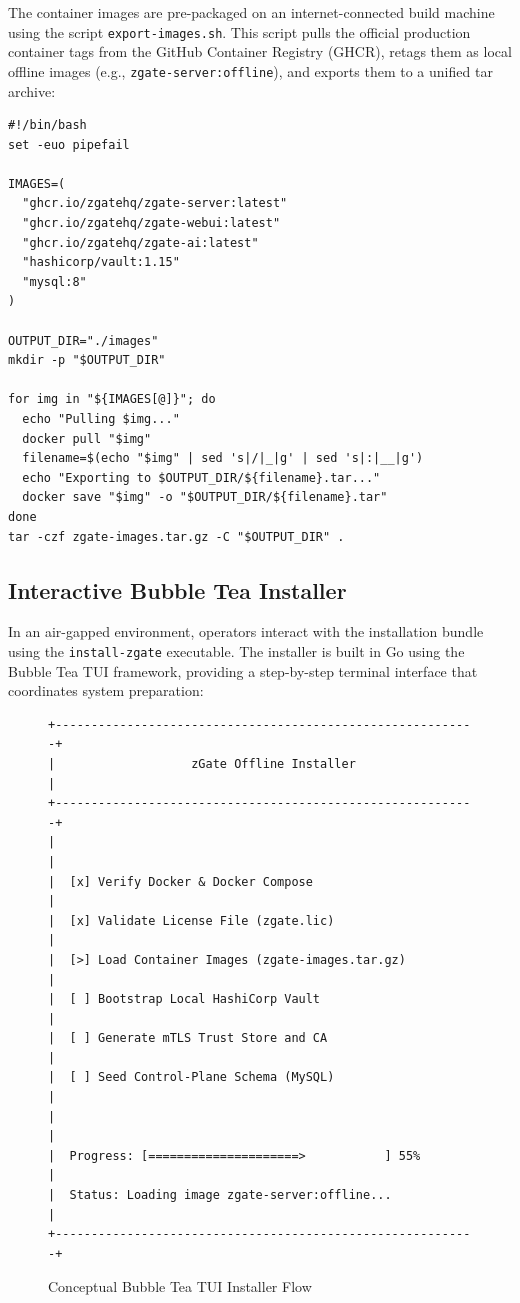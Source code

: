 The container images are pre-packaged on an internet-connected build machine using the script \texttt{export-images.sh}. This script pulls the official production container tags from the GitHub Container Registry (GHCR), retags them as local offline images (e.g., \texttt{zgate-server:offline}), and exports them to a unified tar archive:

\begin{lstlisting}[style=code, caption=Offline Image Packaging Script (\texttt{export-images.sh})]
#!/bin/bash
set -euo pipefail

IMAGES=(
  "ghcr.io/zgatehq/zgate-server:latest"
  "ghcr.io/zgatehq/zgate-webui:latest"
  "ghcr.io/zgatehq/zgate-ai:latest"
  "hashicorp/vault:1.15"
  "mysql:8"
)

OUTPUT_DIR="./images"
mkdir -p "$OUTPUT_DIR"

for img in "${IMAGES[@]}"; do
  echo "Pulling $img..."
  docker pull "$img"
  filename=$(echo "$img" | sed 's|/|_|g' | sed 's|:|__|g')
  echo "Exporting to $OUTPUT_DIR/${filename}.tar..."
  docker save "$img" -o "$OUTPUT_DIR/${filename}.tar"
done
tar -czf zgate-images.tar.gz -C "$OUTPUT_DIR" .
\end{lstlisting}

\subsection{Interactive Bubble Tea Installer}
In an air-gapped environment, operators interact with the installation bundle using the \texttt{install-zgate} executable. The installer is built in Go using the Bubble Tea TUI framework, providing a step-by-step terminal interface that coordinates system preparation:

\begin{figure}[H]
    \centering
    \begin{mdframed}[backgroundcolor=gray!10, linecolor=gray!40, linewidth=2pt]
        \begin{verbatim}
+-----------------------------------------------------------+
|                   zGate Offline Installer                 |
+-----------------------------------------------------------+
|                                                           |
|  [x] Verify Docker & Docker Compose                       |
|  [x] Validate License File (zgate.lic)                    |
|  [>] Load Container Images (zgate-images.tar.gz)          |
|  [ ] Bootstrap Local HashiCorp Vault                      |
|  [ ] Generate mTLS Trust Store and CA                     |
|  [ ] Seed Control-Plane Schema (MySQL)                    |
|                                                           |
|  Progress: [=====================>           ] 55%        |
|  Status: Loading image zgate-server:offline...            |
+-----------------------------------------------------------+
        \end{verbatim}
    \end{mdframed}
    \caption{Conceptual Bubble Tea TUI Installer Flow}
    \label{fig:tui-installer}
\end{figure}

